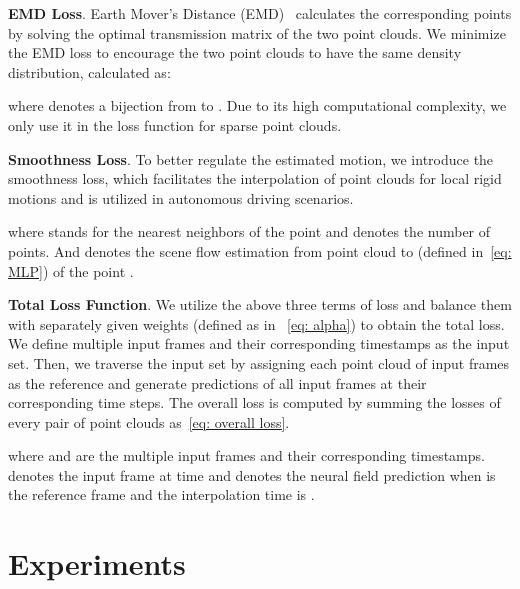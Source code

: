 \documentclass[10pt,twocolumn,letterpaper]{article}
\begin{document}
\textbf{EMD Loss}. Earth Mover's Distance (EMD)~\cite{rubner2000earth} calculates the corresponding points by solving the optimal transmission matrix of the two point clouds. We minimize the EMD loss to encourage the two point clouds to have the same density distribution, calculated as:
\vspace{-.1cm}

\vspace{-.4cm}

\noindent where  denotes a bijection from  to . Due to its high computational complexity, we only use it in the loss function for sparse point clouds. 


\textbf{Smoothness Loss}. To better regulate the estimated motion, we introduce the smoothness loss, which facilitates the interpolation of point clouds for local rigid motions and is utilized in autonomous driving scenarios.  
\vspace{-.05cm}
\begin{small}

\end{small}

\noindent where  stands for the nearest neighbors of the  point  and  denotes the number of points. And  denotes the scene flow estimation  from point cloud  to  (defined in~\cref{eq: MLP}) of the  point .



\textbf{Total Loss Function}. We utilize the above three terms of loss and balance them with separately given weights (defined as  in ~\cref{eq: alpha}) to obtain the total loss. We define multiple input frames and their corresponding timestamps as the input set. Then, we traverse the input set by assigning each point cloud of input frames as the reference and generate predictions of all input frames at their corresponding time steps. The overall loss is computed by summing the losses of every pair of point clouds as~\cref{eq: overall loss}.
\vspace{-0.1cm}

\vspace{-.4cm}


\noindent where  and  are the multiple input frames and their corresponding timestamps.  denotes the input frame at time  and  denotes the neural field prediction when  is the reference frame and the interpolation time is . 




\section{Experiments}
\label{sec: experiments}
\end{document}
